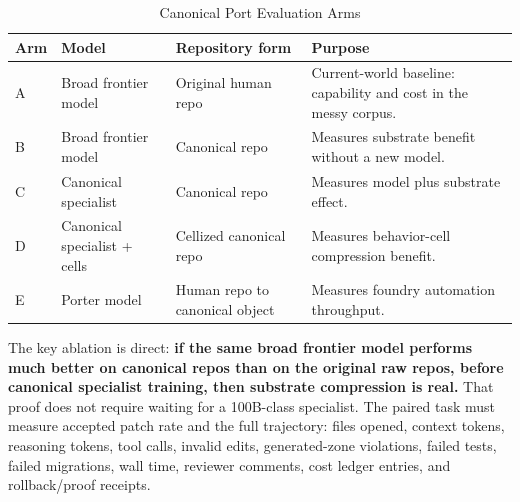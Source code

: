 \begin{table}[t]
\caption{Canonical Port Evaluation Arms}
\label{tab:evalarms}
\centering
\footnotesize
\begin{tabularx}{\textwidth}{p{}p{}p{}X}
\toprule
Arm & Model & Repository form & Purpose \\
\midrule
A & Broad frontier model & Original human repo & Current-world baseline: capability and cost in the messy corpus. \\
B & Broad frontier model & Canonical repo & Measures substrate benefit without a new model. \\
C & Canonical specialist & Canonical repo & Measures model plus substrate effect. \\
D & Canonical specialist + cells & Cellized canonical repo & Measures behavior-cell compression benefit. \\
E & Porter model & Human repo to canonical object & Measures foundry automation throughput. \\
\bottomrule
\end{tabularx}
\end{table}

The key ablation is direct: \textbf{if the same broad frontier model performs much better on canonical repos than on the original raw repos, before canonical specialist training, then substrate compression is real.} That proof does not require waiting for a 100B-class specialist. The paired task must measure accepted patch rate and the full trajectory: files opened, context tokens, reasoning tokens, tool calls, invalid edits, generated-zone violations, failed tests, failed migrations, wall time, reviewer comments, cost ledger entries, and rollback/proof receipts.

